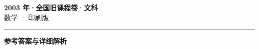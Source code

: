 \documentclass[zihao=5, a4paper]{ctexart}
\begin{document}
\begin{center}
  {\Large\bfseries 2003 年·全国旧课程卷·文科}\\[4pt]
  {\large 数学 · 印刷版}
\end{center}
\medskip
{}

\par\bigskip\hrule\bigskip
{}
\begin{center}{\large\bfseries 参考答案与详细解析}\end{center}
\smallskip

\end{document}
